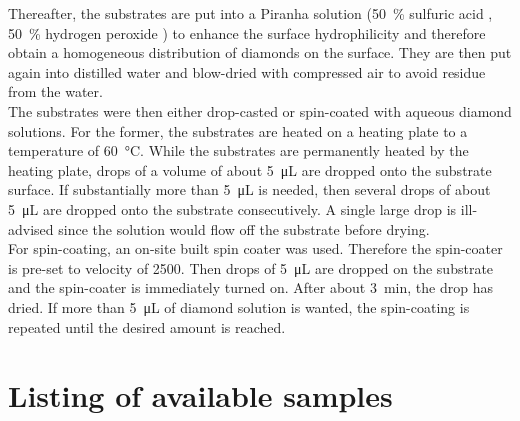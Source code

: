 	Thereafter, the substrates are put into a Piranha solution (\SI{50}{\percent} sulfuric acid , \SI{50}{\percent} hydrogen peroxide ) to enhance the surface hydrophilicity and therefore obtain a homogeneous distribution of diamonds on the surface.
	They are then put again into distilled water and blow-dried with compressed air to avoid residue from the water.
	\\
	The substrates were then either drop-casted or spin-coated with aqueous diamond solutions.
	For the former, the substrates are heated on a heating plate to a temperature of \SI{60}{\celsius}.
	While the substrates are permanently heated by the heating plate, drops of a volume of about \SI{5}{\micro\liter} are dropped onto the substrate surface.
	If substantially more than \SI{5}{\micro\liter} is needed, then several drops of about \SI{5}{\micro\liter} are dropped onto the substrate consecutively. A single large drop is ill-advised since the solution would flow off the substrate before drying.
	\\
	For spin-coating, an on-site built spin coater was used.
	Therefore the spin-coater is pre-set to  velocity of \SI{2500}{\rpm}.
	Then drops of \SI{5}{\micro\liter} are dropped on the substrate and the spin-coater is immediately turned on.
	After about \SI{3}{\minute}, the drop has dried.
	If more than \SI{5}{\micro\liter} of diamond solution is wanted, the spin-coating is repeated until the desired amount is reached.

 \section{Listing of available samples}

